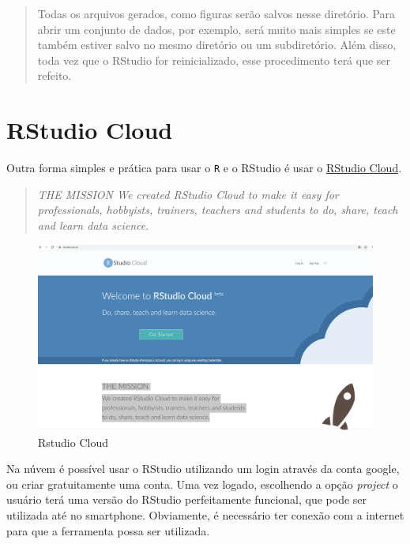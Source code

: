\documentclass[
]{book}
\theoremstyle{definition}
\theoremstyle{definition}
\theoremstyle{definition}
\theoremstyle{remark}
\begin{document}
\begin{quote}
Todas os arquivos gerados, como figuras serão salvos nesse diretório. Para abrir um conjunto de dados, por exemplo, será muito mais simples se este também estiver salvo no mesmo diretório ou um subdiretório. Além disso, toda vez que o RStudio for reinicializado, esse procedimento terá que ser refeito.
\end{quote}

\hypertarget{rstudio-cloud}{%
\section{RStudio Cloud}\label{rstudio-cloud}}

Outra forma simples e prática para usar o \texttt{R} e o RStudio é usar o \href{https://rstudio.cloud/}{RStudio Cloud}.

\begin{quote}
\emph{THE MISSION
We created RStudio Cloud to make it easy for professionals, hobbyists, trainers, teachers and students to do, share, teach and learn data science}. \citep{rstudiocloud}
\end{quote}

\begin{figure}
\includegraphics[width=0.9\linewidth]{Figuras/RStudioCloud} \caption{Rstudio Cloud}\label{fig:rstudiocloud}
\end{figure}

Na núvem é possível usar o RStudio utilizando um login através da conta google, ou criar gratuitamente uma conta. Uma vez logado, escolhendo a opção \emph{project} o usuário terá uma versão do RStudio perfeitamente funcional, que pode ser utilizada até no smartphone. Obviamente, é necessário ter conexão com a internet para que a ferramenta possa ser utilizada.
\end{document}
